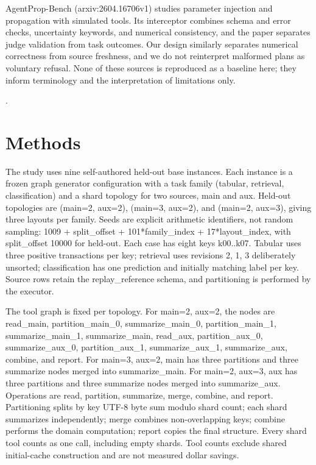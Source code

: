 \documentclass{article}
\begin{document}
AgentProp-Bench (arxiv:2604.16706v1) studies parameter injection and propagation with simulated tools. Its interceptor combines schema and error checks, uncertainty keywords, and numerical consistency, and the paper separates judge validation from task outcomes. Our design similarly separates numerical correctness from source freshness, and we do not reinterpret malformed plans as voluntary refusal. None of these sources is reproduced as a baseline here; they inform terminology and the interpretation of limitations only.

\citep{ref0001,ref0002,ref0003}.

\section{Methods}

The study uses nine self-authored held-out base instances. Each instance is a frozen graph generator configuration with a task family (tabular, retrieval, classification) and a shard topology for two sources, main and aux. Held-out topologies are (main=2, aux=2), (main=3, aux=2), and (main=2, aux=3), giving three layouts per family. Seeds are explicit arithmetic identifiers, not random sampling: 1009 + split\_offset + 101*family\_index + 17*layout\_index, with split\_offset 10000 for held-out. Each case has eight keys k00..k07. Tabular uses three positive transactions per key; retrieval uses revisions 2, 1, 3 deliberately unsorted; classification has one prediction and initially matching label per key. Source rows retain the replay\_reference schema, and partitioning is performed by the executor.

The tool graph is fixed per topology. For main=2, aux=2, the nodes are read\_main, partition\_main\_0, summarize\_main\_0, partition\_main\_1, summarize\_main\_1, summarize\_main, read\_aux, partition\_aux\_0, summarize\_aux\_0, partition\_aux\_1, summarize\_aux\_1, summarize\_aux, combine, and report. For main=3, aux=2, main has three partitions and three summarize nodes merged into summarize\_main. For main=2, aux=3, aux has three partitions and three summarize nodes merged into summarize\_aux. Operations are read, partition, summarize, merge, combine, and report. Partitioning splits by key UTF-8 byte sum modulo shard count; each shard summarizes independently; merge combines non-overlapping keys; combine performs the domain computation; report copies the final structure. Every shard tool counts as one call, including empty shards. Tool counts exclude shared initial-cache construction and are not measured dollar savings.
\end{document}

